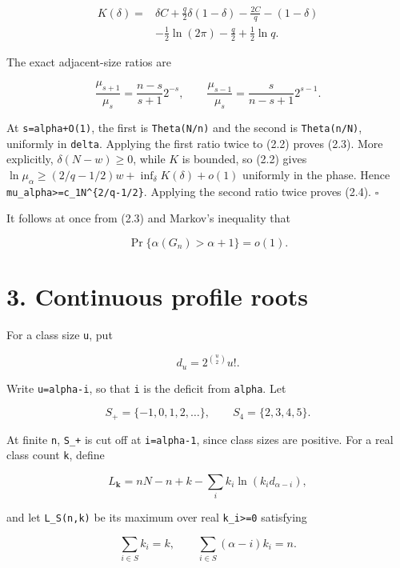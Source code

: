 \documentclass[
  11pt,
  a4paper,
]{article}
\begin{document}
\[
\begin{split}
 K(\delta)={}&\delta C+\frac q2\delta(1-\delta)-\frac{2C}{q}
 -(1-\delta)\\
 &-\frac12\ln(2\pi)-\frac q2+\frac12\ln q.
\end{split}                                               \tag{2.7}
\]

The exact adjacent-size ratios are

\[
 \frac{\mu_{s+1}}{\mu_s}
 =\frac{n-s}{s+1}2^{-s},\qquad
 \frac{\mu_{s-1}}{\mu_s}
 =\frac{s}{n-s+1}2^{s-1}.                                \tag{2.8}
\]

At \texttt{s=alpha+O(1)}, the first is \texttt{Theta(N/n)} and the
second is \texttt{Theta(n/N)}, uniformly in \texttt{delta}. Applying the
first ratio twice to (2.2) proves (2.3). More explicitly,
\(\delta(N-w)\ge0\), while \(K\) is bounded, so (2.2) gives
\(\ln\mu_\alpha\ge(2/q-1/2)w+\inf_\delta K(\delta)+o(1)\) uniformly in
the phase. Hence
\texttt{mu\_}\allowbreak{}\texttt{alpha\textgreater{}}\allowbreak{}\texttt{=}\allowbreak{}\texttt{c\_}\allowbreak{}\texttt{1N\^{}\{2/}\allowbreak{}\texttt{q-1/}\allowbreak{}\texttt{2\}}.
Applying the second ratio twice proves (2.4). \(\square\)

It follows at once from (2.3) and Markov's inequality that

\[
 \Pr\{\alpha(G_n)>\alpha+1\}=o(1).                       \tag{2.9}
\]

\section{3. Continuous profile roots}\label{continuous-profile-roots}

For a class size \texttt{u}, put

\[
 d_u=2^{\binom u2}u!.
\]

Write \texttt{u=alpha-i}, so that \texttt{i} is the deficit from
\texttt{alpha}. Let

\[
 S_+=\{-1,0,1,2,\ldots\},\qquad S_4=\{2,3,4,5\}.         \tag{3.1}
\]

At finite \texttt{n}, \texttt{S\_+} is cut off at \texttt{i=alpha-1},
since class sizes are positive. For a real class count \texttt{k},
define

\[
 L_{\mathbf k}=nN-n+k-\sum_i k_i\ln(k_id_{\alpha-i}),    \tag{3.2}
\]

and let \texttt{L\_S(n,k)} be its maximum over real
\texttt{k\_i\textgreater{}=0} satisfying

\[
 \sum_{i\in S}k_i=k,\qquad
 \sum_{i\in S}(\alpha-i)k_i=n.                           \tag{3.3}
\]
\end{document}
